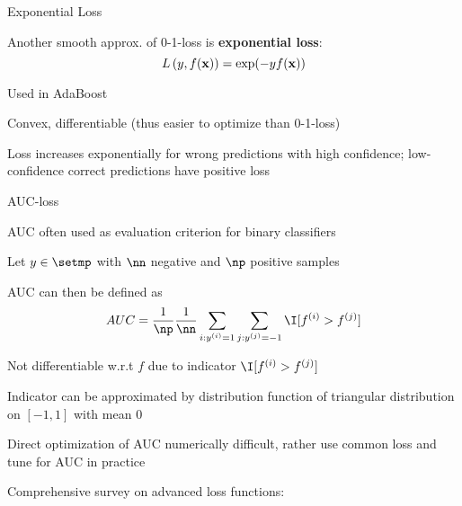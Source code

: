 \documentclass[11pt,compress,t,notes=noshow, xcolor=table]{beamer}
\begin{document}
\begin{framei}[sep=M]{Exponential Loss}

\item Another smooth 
approx. of 0-1-loss is \textbf{exponential loss}:
$$L\left(y, f(\mathbf{x})\right) = \exp(-y f(\mathbf{x}))$$ 
\item Used in AdaBoost
\item Convex, differentiable (thus easier to optimize than 0-1-loss)
\item Loss increases exponentially for wrong predictions with high confidence; low-confidence correct predictions have positive loss


\end{framei}

\begin{frame}{AUC-loss}

\begin{itemizeM}
\item AUC often used as evaluation criterion for binary classifiers
\item Let $y \in \setmp$ with $\nn$ negative and $\np$ positive samples 
\item AUC can then be defined as
$$AUC = \frac{1}{\np} \frac{1}{\nn} \sum_{i: \yi = 1} \sum_{j: \yi[j] = -1} \I [f^{(i)} > f^{(j)}]$$
\item Not differentiable w.r.t $f$ due to indicator $\I [f^{(i)} > f^{(j)}]$
\item Indicator can be approximated by distribution function of triangular distribution on $[-1, 1]$ with mean $0$
\item Direct optimization of AUC numerically difficult, rather use common loss and tune for AUC in practice
\end{itemizeM}
\vfill
Comprehensive survey on advanced loss functions: 

\end{frame}

\endlecture
\end{document}
